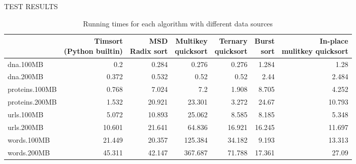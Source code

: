 \sffamily\normalsize{\color{sciorange}TEST RESULTS}\small\\
\footnotesize 
\begin{table}
   \begin{tabular}{| l | r | r | r | r | r | r |}
   \hline
    & \specialcell{Timsort\\(Python builtin)}& \specialcell{MSD \\Radix sort} & \specialcell{Multikey\\ quicksort}&\specialcell{Ternary \\quicksort} & \specialcell{Burst \\ sort}  &  \specialcell{In-place \\ mulitkey quicksort}\\ 
    \hline 
    dna.100MB&          0.2&        0.284&      0.276&      0.276&      1.284&      1.28\\
    dna.200MB&          0.372&      0.532&      0.52&       0.52&       2.44&       2.484\\
    proteins.100MB&     0.768&      7.024&      7.2&        1.908&      8.705&      4.252\\
    proteins.200MB&     1.532&      20.921&     23.301&     3.272&      24.67&      10.793\\
    urls.100MB&         5.072&      10.893&     25.062&     8.585&      8.185&      5.348\\
    urls.200MB&         10.601&     21.641&     64.836&     16.921&     16.245&     11.697\\
    words.100MB&        21.449&     20.357&     125.384&    34.182&     9.193&      13.313\\
    words.200MB&        45.311&     42.147&     367.687&    71.788&     17.361&     27.09\\ 
    \hline
  \end{tabular}
\caption{Running times for each algorithm with different data sources}
\label{dataset}
\end{table}
